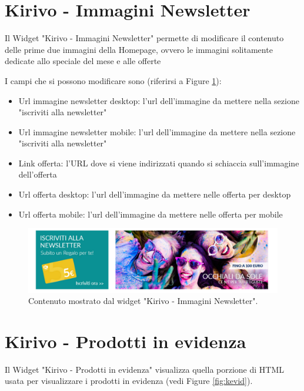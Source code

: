 
\newpage
\section{Kirivo - Immagini Newsletter}

Il Widget "Kirivo - Immagini Newsletter" permette di modificare il contenuto
delle prime due immagini della Homepage, ovvero le immagini solitamente dedicate
allo speciale del mese e alle offerte 

I campi che si possono modificare sono (riferirsi a Figure \ref{fig:knews}):
\begin{itemize}
\item Url immagine newsletter desktop: l'url dell'immagine da mettere nella sezione "iscriviti alla newsletter"
\item Url immagine newsletter mobile: l'url dell'immagine da mettere nella sezione "iscriviti alla newsletter"
\item Link offerta: l'URL dove si viene indirizzati quando si schiaccia sull'immagine dell'offerta
\item Url offerta desktop: l'url dell'immagine da mettere nelle offerta per desktop
\item Url offerta mobile: l'url dell'immagine da mettere nelle offerta per mobile
\end{itemize}

\begin{figure}
  \includegraphics[width=\textwidth]{figure/knews.png}
  \caption{Contenuto mostrato dal widget "Kirivo - Immagini Newsletter".}
  \label{fig:knews}
\end{figure}


\newpage
\section{Kirivo - Prodotti in evidenza}

Il Widget "Kirivo - Prodotti in evidenza" visualizza quella porzione di HTML usata
per visualizzare i prodotti in evidenza (vedi Figure \ref{fig:kevid}).


